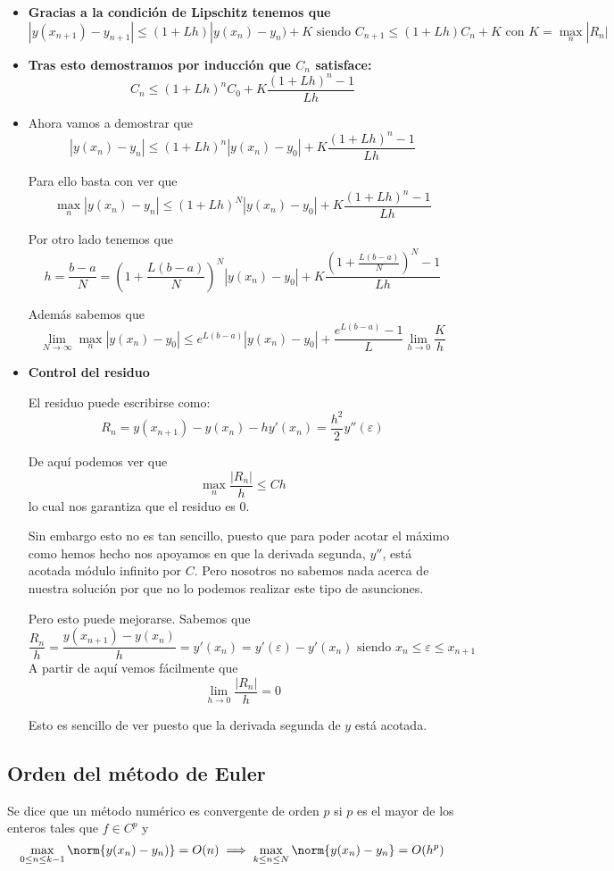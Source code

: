 \documentclass{apuntes}
\begin{document}
\begin{itemize}
\item \textbf{Gracias a la condición de Lipschitz tenemos que}
\[|y(x_{n+1})-y_{n+1}| \leq (1+Lh)|y(x_n)-y_n)+K \text{ siendo } C_{n+1} \leq (1+Lh)C_n + K \text{ con } K = \max_n |R_n|\]

\item \textbf{ Tras esto demostramos por inducción que $C_n$ satisface:}
\[C_n \leq (1+Lh)^n C_0 + K\frac{(1+Lh)^n-1}{Lh}\]

\item Ahora vamos a demostrar que
\[|y(x_n) - y_n| \leq (1+Lh)^n |y(x_n)-y_0|+K\frac{(1+Lh)^n-1}{Lh}\]

Para ello basta con ver que
\[\max_n |y(x_n)-y_n| \leq (1+Lh)^N|y(x_n)-y_0| + K\frac{(1+Lh)^n-1}{Lh}\]

Por otro lado tenemos que
\[h = \frac{b-a}{N}= \left( 1+\frac{L(b-a)}{N}\right)^N|y(x_n)-y_0| + K \frac{\left(1+\frac{L(b-a)}{N} \right)^N-1}{Lh}\]

Además sabemos que
\[\lim_{N \to \infty} \max_n |y(x_n)-y_0| \leq e^{L(b-a)} |y(x_n)-y_0| + \frac{e^{L(b-a)}-1}{L}\lim_{h \to 0} \frac{K}{h}\]

\item \textbf{Control del residuo}

El residuo puede escribirse como:
\[R_n = y(x_{n+1})-y(x_n)-hy'(x_n) = \frac{h^2}{2}y''(ε)\]

De aquí podemos ver que
\[\max_n \frac{|R_n|}{h} \leq C h\]
lo cual nos garantiza que el residuo es 0.

Sin embargo esto no es tan sencillo, puesto que para poder acotar el máximo como hemos hecho nos apoyamos en que la derivada segunda, $y''$, está acotada módulo infinito por $C$. Pero nosotros no sabemos nada acerca de nuestra solución por que no lo podemos realizar este tipo de asunciones.

Pero esto puede mejorarse. Sabemos que
\[\frac{R_n}{h} = \frac{y(x_{n+1})-y(x_n)}{h} = y'(x_n) = y'(ε)-y'(x_n) \text{ siendo } x_n \leq ε \leq x_{n+1}\]
A partir de aquí vemos fácilmente que
\[\lim_{h\to 0} \frac{|R_n|}{h} = 0\]

Esto es sencillo de ver puesto que la derivada segunda de $y$ está acotada.
\end{itemize}

\subsection{Orden del método de Euler}
\begin{defn}
Se dice que un método numérico es convergente de orden $p$ si $p$ es el mayor de los enteros tales que $f \in C^p$ y
\[\max_{0 \leq n \leq k-1}\norm{y(x_n)-y_n)}= O(n)\implies \max_{k \leq n \leq N} \norm{y(x_n)-y_n}=O(h^p)\]
\end{defn}
\end{document}
